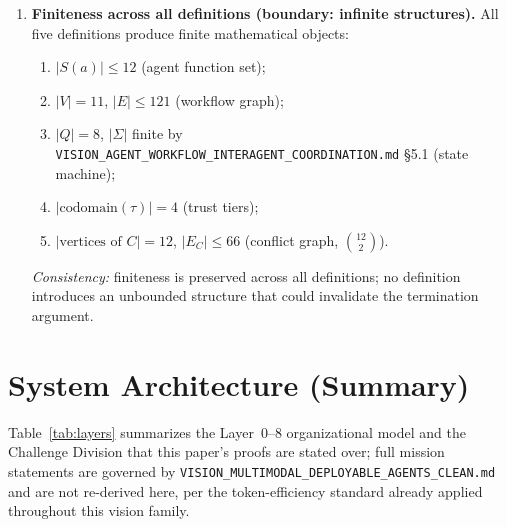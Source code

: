 \documentclass[12pt]{article}
\theoremstyle{definition}
\newcommand{\code}[1]{\texttt{#1}}
\newcommand{\VisionClean}{\code{VISION\_MULTIMODAL\_\allowbreak DEPLOYABLE\_\allowbreak AGENTS\_CLEAN.md}}
\newcommand{\VisionFlow}{\code{VISION\_AGENT\_\allowbreak WORKFLOW\_\allowbreak INTERAGENT\_\allowbreak COORDINATION.md}}
\begin{document}
\begin{enumerate}[label=\textbf{X\arabic*.}, leftmargin=*, widest=X9]
  \item \textbf{Finiteness across all definitions (boundary:
        infinite structures).}
        All five definitions produce finite mathematical objects:
        \begin{enumerate}[label=(\alph*), leftmargin=*]
          \item $|S(a)| \leq 12$ (agent function set);
          \item $|V| = 11$, $|E| \leq 121$ (workflow graph);
          \item $|Q| = 8$, $|\Sigma|$ finite by \VisionFlow{}
                \S5.1 (state machine);
          \item $|\text{codomain}(\tau)| = 4$ (trust tiers);
          \item $|\text{vertices of }C| = 12$,
                $|E_C| \leq 66$ (conflict graph, $\binom{12}{2}$).
        \end{enumerate}
        \emph{Consistency:} finiteness is preserved across all
        definitions; no definition introduces an unbounded structure
        that could invalidate the termination argument.

\end{enumerate}

\section{System Architecture (Summary)}
\label{sec:architecture}

Table~\ref{tab:layers} summarizes the Layer~0--8 organizational model and
the Challenge Division that this paper's proofs are stated over; full
mission statements are governed by \VisionClean{} and are not re-derived here, per the token-efficiency
standard already applied throughout this vision family.
\end{document}
